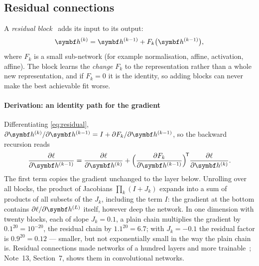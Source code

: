 \documentclass[11pt]{article}
\newcommand{\hv}{\vect{h}}
\begin{document}
\subsection{Residual connections}\label{sec:residual}

A \emph{residual block}~\cite{he2016} adds its input to its output:
\begin{equation}\label{eq:residual}
  \hv^{(k)} = \hv^{(k-1)} + F_k\big(\hv^{(k-1)}\big) ,
\end{equation}
where $F_k$ is a small sub-network (for example normalisation, affine, activation, affine). The block learns the
\emph{change} $F_k$ to the representation rather than a whole new representation, and if $F_k = 0$ it is the identity,
so adding blocks can never make the best achievable fit worse.

\paragraph{Derivation: an identity path for the gradient} Differentiating \eqref{eq:residual},
$\partial\hv^{(k)}/\partial\hv^{(k-1)} = I + \partial F_k/\partial\hv^{(k-1)}$, so the backward recursion reads
\[
  \frac{\partial\ell}{\partial\hv^{(k-1)}} = \frac{\partial\ell}{\partial\hv^{(k)}} +
  \Big(\frac{\partial F_k}{\partial\hv^{(k-1)}}\Big)^{\!\mathsf{T}}\frac{\partial\ell}{\partial\hv^{(k)}} .
\]
The first term copies the gradient unchanged to the layer below. Unrolling over all blocks, the product of
Jacobians $\prod_k (I + J_k)$ expands into a sum of products of all subsets of the $J_k$, including the term $I$: the
gradient at the bottom contains $\partial\ell/\partial\hv^{(L)}$ itself, however deep the network. In one dimension with
twenty blocks, each of slope $J_k = 0.1$, a plain chain multiplies the gradient by $0.1^{20} = 10^{-20}$, the residual
chain by $1.1^{20} = 6.7$; with $J_k = -0.1$ the residual factor is $0.9^{20} = 0.12$ --- smaller, but not exponentially
small in the way the plain chain is. Residual connections made networks of a hundred layers and more
trainable~\cite{he2016}; Note~13, Section~7, shows them in convolutional networks.
\end{document}

